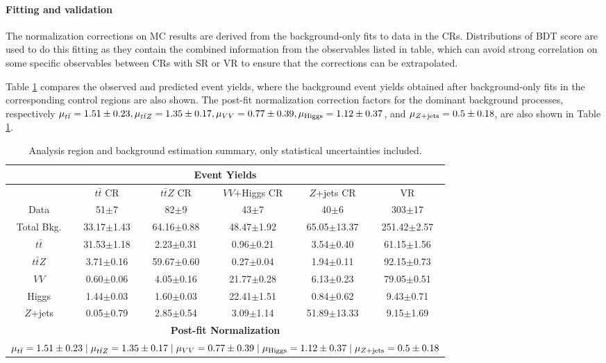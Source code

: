 \paragraph{Fitting and validation}

The normalization corrections on MC results are derived from the background-only fits to data in the CRs. Distributions of BDT score are used to do this fitting as they contain the combined information from the observables listed in table, which can avoid strong correlation on some specific observables between CRs with SR or VR to ensure that the corrections can be extrapolated.

Table \ref{Tab.yields} compares the observed and predicted event yields, where the background event yields obtained after background-only fits in the corresponding control regions are also shown. The post-fit normalization correction factors for the dominant background processes, respectively $\mu_{t\bar{t}}=1.51\pm0.23,\mu_{t\bar{t}Z}=1.35\pm0.17,\mu_{VV}=0.77\pm0.39,\mu_{\rm Higgs}=1.12\pm0.37$, and $\mu_{Z+{\rm jets}}=0.5\pm0.18$, are also shown in Table \ref{Tab.yields}.

\begin{table}[H]
\begin{center}
\caption{Analysis region and background estimation summary, only statistical uncertainties included.}
\label{Tab.yields}
	\begin{tabular}{cccccc}
		\toprule
		\toprule
		\multicolumn{6}{c}{\textbf{Event Yields}}\\
		\midrule
		&$t\bar{t}$ CR&$t\bar{t}Z$ CR&$VV$+Higgs CR&$Z$+jets CR&VR\\
		\midrule
		Data	&51$\pm$7&82$\pm$9&43$\pm$7&40$\pm$6&303$\pm$17\\
		\midrule
		Total Bkg.&33.17$\pm$1.43&64.16$\pm$0.88&48.47$\pm$1.92&65.05$\pm$13.37&251.42$\pm$2.57\\
		\midrule
		$t\bar{t}$&31.53$\pm$1.18&2.23$\pm$0.31&0.96$\pm$0.21&3.54$\pm$0.40&61.15$\pm$1.56\\
		$t\bar{t}Z$&3.71$\pm$0.16&59.67$\pm$0.60&0.27$\pm$0.04&1.94$\pm$0.11&92.15$\pm$0.73\\
		$VV$	&0.60$\pm$0.06&4.05$\pm$0.16&21.77$\pm$0.28&6.13$\pm$0.23&79.05$\pm$0.51\\
		Higgs	&1.44$\pm$0.03&1.60$\pm$0.03&22.41$\pm$1.51&0.84$\pm$0.62&9.43$\pm$0.71\\
		$Z$+jets&0.05$\pm$0.79&2.85$\pm$0.54&3.09$\pm$1.14&51.89$\pm$13.33&9.15$\pm$1.69\\
		\midrule
		\midrule
		\multicolumn{6}{c}{\textbf{Post-fit Normalization}}\\
		\midrule
		\multicolumn{6}{c}{$\mu_{t\bar{t}}=1.51\pm0.23\mid\mu_{t\bar{t}Z}=1.35\pm0.17\mid\mu_{VV}=0.77\pm0.39\mid\mu_{\rm Higgs}=1.12\pm0.37\mid\mu_{Z+{\rm jets}}=0.5\pm0.18$}\\
		\bottomrule
		\bottomrule
	\end{tabular}
\end{center}
\end{table}

